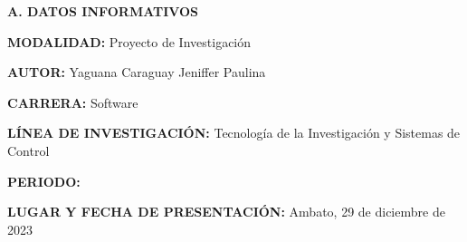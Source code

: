 


\setcounter{page}{2}

\tableofcontents
\pagebreak
\listoftables

\pagebreak

\begin{center}
	\textbf{A. DATOS INFORMATIVOS}
\end{center}\par
\textbf{MODALIDAD: } Proyecto de Investigación\par
\textbf{AUTOR: } Yaguana Caraguay Jeniffer Paulina\par
\textbf{CARRERA: } Software\par
\textbf{LÍNEA DE INVESTIGACIÓN: } Tecnología de la Investigación y Sistemas de Control\par
\textbf{PERIODO: } \periodo\par
\textbf{LUGAR Y FECHA DE PRESENTACIÓN: } Ambato, 29 de diciembre de 2023
\pagebreak
